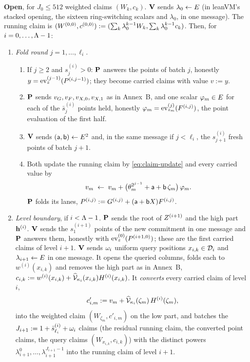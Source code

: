 \begin{protocol}
\smallskip\noindent\textbf{Open}, for $J_0\le512$ weighted claims $(W_k,c_k)$. $\mathbf{V}$ sends $\lambda_0\leftarrow E$ (in leanVM's stacked opening, the sixteen ring-switching scalars and $\lambda_0$, in one message). The running claim is $(W^{(0,0)},c^{(0,0)}):=(\sum_k\lambda_0^{k-1}W_k,\sum_k\lambda_0^{k-1}c_k)$. Then, for $i=0,\dots,\Lambda-1$:
\begin{enumerate}[itemsep=1pt,topsep=2pt]
\item \emph{Fold round $j=1,\dots,\ell_i$.}
\begin{enumerate}[itemsep=0pt,topsep=1pt,label=(\alph*)]
\item If $j\ge2$ and $s^{(i)}_j>0$: $\mathbf{P}$ answers the points of batch $j$, honestly $y=\operatorname{ev}^{(j-1)}_{z}(P^{(i,j-1)})$; they become carried claims with value $v:=y$.
\item $\mathbf{P}$ sends $v_G,v_F,v_{X,0},v_{X,1}$ as in Annex~B, and one scalar $\varphi_m\in E$ for each of the $\bar s^{(i)}_j$ points held, honestly $\varphi_m=\operatorname{ev}^{(j)}_{z_m}(F^{(i,j)})$, the point evaluation of the first half.
\item $\mathbf{V}$ sends $(\mathsf{a},\mathsf{b})\leftarrow E^2$ and, in the same message if $j<\ell_i$, the $s^{(i)}_{j+1}$ fresh points of batch $j+1$.
\item Both update the running claim by \eqref{eq:claim-update} and every carried value by
\begin{equation}\label{eq:carry}
v_m\;\leftarrow\;v_m+\bigl(\theta_m^{2^{j-1}}+\mathsf{a}+\mathsf{b}\,\zeta_m\bigr)\,\varphi_m .
\end{equation}
$\mathbf{P}$ folds its lanes, $P^{(i,j)}:=G^{(i,j)}+(\mathsf{a}+\mathsf{b} X)F^{(i,j)}$.
\end{enumerate}
\item \emph{Level boundary}, if $i<\Lambda-1$. $\mathbf{P}$ sends the root of $Z^{(i+1)}$ and the high part $\mathbf{h}^{(i)}$. $\mathbf{V}$ sends the $s^{(i+1)}_1$ points of the new commitment in one message and $\mathbf{P}$ answers them, honestly with $\operatorname{ev}^{(0)}_z(P^{(i+1,0)})$; these are the first carried claims of level $i+1$. $\mathbf{V}$ sends $\omega_i$ uniform query positions $x_{i,k}\in\mathcal{D}_i$ and $\lambda_{i+1}\leftarrow E$ in one message. It opens the queried columns, folds each to $w^{(i)}(x_{i,k})$ and removes the high part as in Annex~B, $c_{i,k}:=w^{(i)}(x_{i,k})+\widehat{\mathcal{V}}_{\kappa_i}(x_{i,k})H^{(i)}(x_{i,k})$. It \emph{converts} every carried claim of level $i$,
\begin{equation}\label{eq:convert}
c'_{i,m}:=v_m+\widehat{\mathcal{V}}_{\kappa_i}(\zeta_m)\,H^{(i)}(\zeta_m),
\end{equation}
into the weighted claim $(W_{\zeta_m},c'_{i,m})$ on the low part, and batches the $J_{i+1}:=1+\bar s^{(i)}_{\ell_i}+\omega_i$ claims (the residual running claim, the converted point claims, the query claims $(W_{x_{i,k}},c_{i,k})$) with the distinct powers $\lambda_{i+1}^0,\dots,\lambda_{i+1}^{J_{i+1}-1}$ into the running claim of level $i+1$.

\end{enumerate}
\end{protocol}
